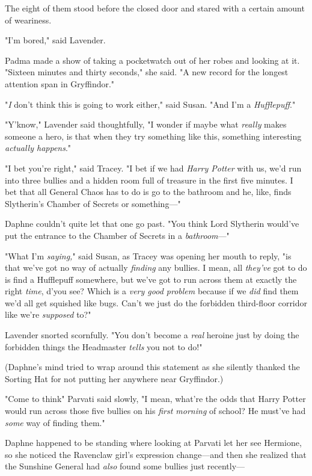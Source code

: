 The eight of them stood before the closed door and stared with a certain amount
of weariness.

"I'm bored," said Lavender.

Padma made a show of taking a pocketwatch out of her robes and looking at it.
"Sixteen minutes and thirty seconds," she said. "A new record for the longest
attention span in Gryffindor."

"\emph{I} don't think this is going to work either," said Susan. "And I'm a
\emph{Hufflepuff}."

"Y'know," Lavender said thoughtfully, "I wonder if maybe what \emph{really}
makes someone a hero, is that when they try something like this, something
interesting \emph{actually happens}."

"I bet you're right," said Tracey. "I bet if we had \emph{Harry Potter} with
us, we'd run into three bullies and a hidden room full of treasure in the first
five minutes. I bet that all General Chaos has to do is go to the bathroom and
he, like, finds Slytherin's Chamber of Secrets or something—"

Daphne couldn't quite let that one go past. "You think Lord Slytherin would've
put the entrance to the Chamber of Secrets in a \emph{bathroom}—"

"What I'm \emph{saying,}" said Susan, as Tracey was opening her mouth to reply,
"is that we've got no way of actually \emph{finding} any bullies. I mean, all
\emph{they've} got to do is find a Hufflepuff somewhere, but we've got to run
across them at exactly the right \emph{time}, d'you see? Which is a \emph{very
good problem} because if we \emph{did} find them we'd all get squished like
bugs. Can't we just do the forbidden third-floor corridor like we're
\emph{supposed} to?"

Lavender snorted scornfully. "You don't become a \emph{real} heroine just by
doing the forbidden things the Headmaster \emph{tells} you not to do!"

(Daphne's mind tried to wrap around this statement as she silently thanked the
Sorting Hat for not putting her anywhere near Gryffindor.)

"Come to think{\el}" Parvati said slowly, "I mean, what're the odds that
Harry Potter would run across those five bullies on his \emph{first morning} of
school? He must've had \emph{some} way of finding them."

Daphne happened to be standing where looking at Parvati let her see Hermione,
so she noticed the Ravenclaw girl's expression change—and then she realized
that the Sunshine General had \emph{also} found some bullies just recently—


